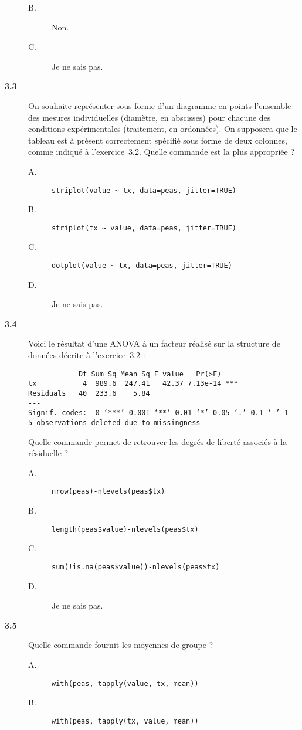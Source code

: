\documentclass[11pt]{report}
\theoremstyle{definition}
\begin{document}
\begin{description}
\begin{description}
  \item[B.] Non.
  \item[C.] Je ne sais pas.
  \end{description}  
\item[\bf 3.3]  On souhaite représenter sous forme
  d'un diagramme en points l'ensemble des mesures individuelles (diamètre,
  en abscisses) pour chacune des conditions expérimentales (traitement, en
  ordonnées). On supposera que le tableau est à présent correctement
  spécifié sous forme de deux colonnes, comme indiqué à
  l'exercice~3.2. Quelle commande est la plus appropriée ?
  \begin{description}
  \item[A.] \verb|striplot(value ~ tx, data=peas, jitter=TRUE)|
  \item[B.] \verb|striplot(tx ~ value, data=peas, jitter=TRUE)|
  \item[C.] \verb|dotplot(value ~ tx, data=peas, jitter=TRUE)|
  \item[D.] Je ne sais pas.
  \end{description}
\item[\bf 3.4]  Voici le résultat d'une ANOVA à un
  facteur réalisé sur la structure de données décrite à l'exercice~3.2 :
\begin{verbatim}
            Df Sum Sq Mean Sq F value   Pr(>F)    
tx           4  989.6  247.41   42.37 7.13e-14 ***
Residuals   40  233.6    5.84                     
---
Signif. codes:  0 ‘***’ 0.001 ‘**’ 0.01 ‘*’ 0.05 ‘.’ 0.1 ‘ ’ 1 
5 observations deleted due to missingness
\end{verbatim}
  Quelle commande permet de retrouver les degrés de liberté associés à la
  résiduelle ? 
  \begin{description}
  \item[A.] \verb|nrow(peas)-nlevels(peas$tx)|
  \item[B.] \verb|length(peas$value)-nlevels(peas$tx)|
  \item[C.] \verb|sum(!is.na(peas$value))-nlevels(peas$tx)|
  \item[D.] Je ne sais pas.
  \end{description}  
\item[\bf 3.5]  Quelle commande fournit les
  moyennes de groupe ?
  \begin{description}
  \item[A.] \verb|with(peas, tapply(value, tx, mean))|
  \item[B.] \verb|with(peas, tapply(tx, value, mean))|

\end{description}
\end{description}
\end{document}
